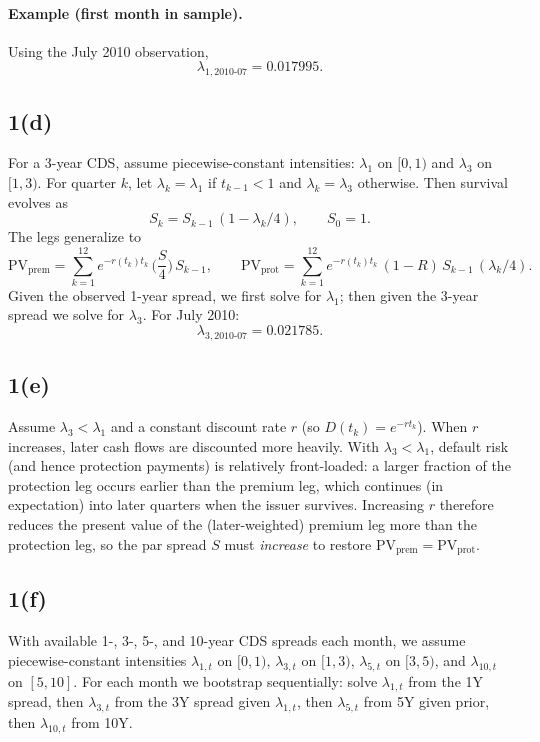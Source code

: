 \paragraph{Example (first month in sample).} Using the July 2010 observation,
\[
\lambda_{1,2010\text{-}07}=0.017995.
\]
\subsection*{1(d)}
For a 3-year CDS, assume piecewise-constant intensities: $\lambda_1$ on $[0,1)$ and $\lambda_3$ on $[1,3)$. For quarter $k$, let $\lambda_k=\lambda_1$ if $t_{k-1}<1$ and $\lambda_k=\lambda_3$ otherwise. Then survival evolves as
\[
S_k=S_{k-1}\,(1-\lambda_k/4),\qquad S_0=1.
\]
The legs generalize to
\[
\mathrm{PV}_{\text{prem}}=\sum_{k=1}^{12} e^{-r(t_k)t_k}\,\Big(\frac{S}{4}\Big)\,S_{k-1},\qquad
\mathrm{PV}_{\text{prot}}=\sum_{k=1}^{12} e^{-r(t_k)t_k}\,(1-R)\,S_{k-1}\,(\lambda_k/4).
\]
Given the observed 1-year spread, we first solve for $\lambda_1$; then given the 3-year spread we solve for $\lambda_3$. For July 2010:
\[ \lambda_{3,2010\text{-}07} = 0.021785. \]
\subsection*{1(e)}
Assume $\lambda_3<\lambda_1$ and a constant discount rate $r$ (so $D(t_k)=e^{-rt_k}$). When $r$ increases, later cash flows are discounted more heavily. With $\lambda_3<\lambda_1$, default risk (and hence protection payments) is relatively front-loaded: a larger fraction of the protection leg occurs earlier than the premium leg, which continues (in expectation) into later quarters when the issuer survives. Increasing $r$ therefore reduces the present value of the (later-weighted) premium leg more than the protection leg, so the par spread $S$ must \emph{increase} to restore $\mathrm{PV}_{\text{prem}}=\mathrm{PV}_{\text{prot}}$.
\subsection*{1(f)}
With available 1-, 3-, 5-, and 10-year CDS spreads each month, we assume piecewise-constant intensities $\lambda_{1,t}$ on $[0,1)$, $\lambda_{3,t}$ on $[1,3)$, $\lambda_{5,t}$ on $[3,5)$, and $\lambda_{10,t}$ on $[5,10]$. For each month we bootstrap sequentially: solve $\lambda_{1,t}$ from the 1Y spread, then $\lambda_{3,t}$ from the 3Y spread given $\lambda_{1,t}$, then $\lambda_{5,t}$ from 5Y given prior, then $\lambda_{10,t}$ from 10Y.
